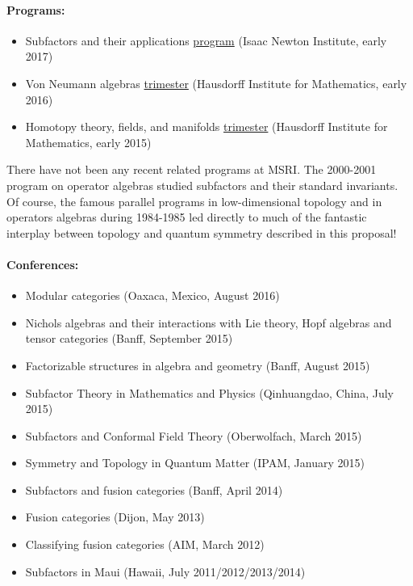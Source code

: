 \documentclass[12pt]{article}
\begin{document}
\paragraph{Programs:}
\begin{itemize}
  \setlength{\itemsep}{1pt}
  \setlength{\parskip}{0pt}
  \setlength{\parsep}{0pt}
\item Subfactors and their applications \href{https://www.newton.ac.uk/event/oas}{program} (Isaac Newton Institute, early 2017)
\item Von Neumann algebras \href{https://www.him.uni-bonn.de/programs/future-programs/future-trimester-programs/von-neumann-algebras-2016/description/}{trimester} (Hausdorff Institute for Mathematics, early 2016)
\item Homotopy theory, fields, and manifolds \href{https://www.him.uni-bonn.de/programs/past-programs/past-trimester-programs/homotopy-theory-2015/description/}{trimester} (Hausdorff Institute for Mathematics, early 2015)
\end{itemize}

There have not been any recent related programs at MSRI. The 2000-2001 program on operator algebras studied subfactors and their standard invariants. Of course, the famous parallel programs in low-dimensional topology and in operators algebras during 1984-1985 led directly to much of the fantastic interplay between topology and quantum symmetry described in this proposal!

\paragraph{Conferences:}
\begin{itemize}
  \setlength{\itemsep}{1pt}
  \setlength{\parskip}{0pt}
  \setlength{\parsep}{0pt}
\item Modular categories (Oaxaca, Mexico, August 2016)
\item Nichols algebras and their interactions with Lie theory, Hopf algebras and tensor categories (Banff, September 2015)
\item Factorizable structures in algebra and geometry (Banff, August 2015)
\item Subfactor Theory in Mathematics and Physics (Qinhuangdao, China, July 2015)
\item Subfactors and Conformal Field Theory (Oberwolfach, March 2015)
\item Symmetry and Topology in Quantum Matter (IPAM, January 2015)
\item Subfactors and fusion categories (Banff, April 2014)
\item Fusion categories (Dijon, May 2013)
\item Classifying fusion categories (AIM, March 2012)
\item Subfactors in Maui (Hawaii, July 2011/2012/2013/2014)
\end{itemize}
\end{document}
